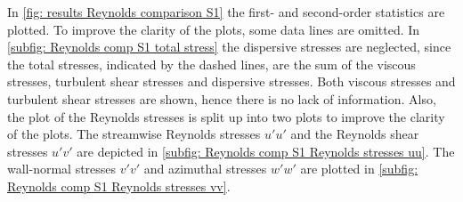 In \autoref{fig: results Reynolds comparison S1} the first- and second-order statistics are plotted.
To improve the clarity of the plots, some data lines are omitted.
In \autoref{subfig: Reynolds comp S1 total stress} the dispersive stresses are neglected, since the total stresses, indicated by the dashed lines, are the sum of the viscous stresses, turbulent shear stresses and dispersive stresses.
Both viscous stresses and turbulent shear stresses are shown, hence there is no lack of information.
Also, the plot of the Reynolds stresses is split up into two plots to improve the clarity of the plots.
The streamwise Reynolds stresses $u'u'$ and the Reynolds shear stresses $u'v'$ are depicted in \autoref{subfig: Reynolds comp S1 Reynolds stresses uu}.
The  wall-normal stresses $v'v'$ and azimuthal stresses $w'w'$ are plotted in \autoref{subfig: Reynolds comp S1 Reynolds stresses vv}.

